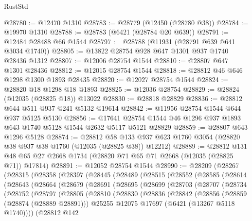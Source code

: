 \begin{lexlean}{RustStd}
\begin{coremodule}
@28780 := @12470 @1310
@28783 := @28779 (@12450 (@28780 @38))
@28784 := @19970 @1310
@28788 := @28783 (@6421 (@28784 @20 @639))
@28791 := @12484 @28488 @66 @1544
@28797 := @28788 (@11931 (@28791 @639 @641 @3034 @1740))
@28805 := @13822 @28754 @928 @647 @1301 @937 @1740 @28436 @1312
@28807 := @12006 @28754 @1544
@28810 := @28807 @647 @1301 @28436
@28812 := @12015 @28754 @1544
@28818 := @28812 @46 @646 @1298 @1300 @1893 @28435
@28820 := @12027 @28754 @1544
@28824 := @28820 @18 @1298 @18 @1893
@28825 := @12036 @28754
@28829 := @28824 (@12035 (@28825 @18)) @13022
@28830 := @28818 @28829
@28836 := @28812 @644 @511 @937 @241 @5132 @19614
@28842 := @11956 @28754 @1544 @644 @937 @5125 @5130
@28856 := @17641 @28754 @1544 @46 @1296 @937 @1893 @643 @1740 @5128 @1544 @2632 @5117 @5121 @28829
@28859 := @28807 @643 @1296 @5128
@28874 := @28812
    @58
    @133
    @937
    @623
    @1760
    @3054
    (@28820 @38 @937 @38 @1760 (@12035 (@28825 @38)) @12212)
@28889 := @28812
    @131
    @48
    @65
    @27
    @2668
    @1734
    (@28820 @71 @65 @71 @2668 (@12035 (@28825 @71)) @17814)
@28891 := @12052 @28754 @1544
@28990 := @28209
    (@28267
      (@28315
        (@28358
          (@28397
            (@28445
              (@28489
                (@28515
                  (@28552
                    (@28585
                      (@28614
                        (@28643
                          (@28664
                            (@28679
                              (@28691
                                (@28695
                                  (@28699
                                    (@28703
                                      (@28707
                                        (@28734
                                          (@28752
                                            (@28797
                                              (@28805
                                                (@28810
                                                  (@28830
                                                    (@28836
                                                      (@28842
                                                        (@28856
                                                          (@28859 (@28874 (@28889 @28891)))
                                                          @25255
                                                          @12075
                                                          @17697
                                                          (@6421 (@13267 @5118 @1740))))
                                                      (@28812
                                                        @142

\end{coremodule}
\end{lexlean}

